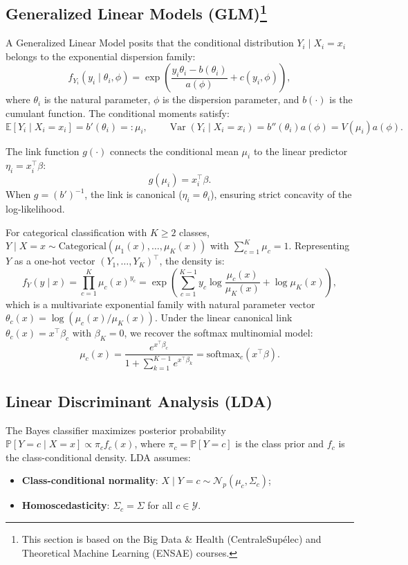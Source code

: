 \documentclass[a4paper,11pt]{paper}
\theoremstyle{plain}
\theoremstyle{definition}
\theoremstyle{remark}
\begin{document}
\subsection{Generalized Linear Models (GLM)\texorpdfstring{\protect\footnote{This section is based on the Big Data \& Health (CentraleSupélec) and Theoretical Machine Learning (ENSAE) courses.}}{}}

A Generalized Linear Model posits that the conditional distribution $Y_i \mid X_i = x_i$ belongs to the exponential dispersion family:
$$f_{Y_i}(y_i \mid \theta_i, \phi) = \exp\left( \frac{y_i \theta_i - b(\theta_i)}{a(\phi)} + c(y_i, \phi) \right),$$
where $\theta_i$ is the natural parameter, $\phi$ is the dispersion parameter, and $b(\cdot)$ is the cumulant function. The conditional moments satisfy:
$$\mathbb{E}[Y_i \mid X_i = x_i] = b'(\theta_i) =: \mu_i, \qquad \operatorname{Var}(Y_i \mid X_i = x_i) = b''(\theta_i) a(\phi) = V(\mu_i) a(\phi).$$

The link function $g(\cdot)$ connects the conditional mean $\mu_i$ to the linear predictor $\eta_i = x_i^\top \beta$:
$$g(\mu_i) = x_i^\top \beta.$$
When $g = (b')^{-1}$, the link is canonical ($\eta_i = \theta_i$), ensuring strict concavity of the log-likelihood.

For categorical classification with $K \ge 2$ classes, $Y \mid X = x \sim \text{Categorical}(\mu_1(x), \dots, \mu_K(x))$ with $\sum_{c=1}^K \mu_c = 1$. Representing $Y$ as a one-hot vector $(Y_1, \dots, Y_K)^\top$, the density is:
$$f_Y(y \mid x) = \prod_{c=1}^K \mu_c(x)^{y_c} = \exp\left( \sum_{c=1}^{K-1} y_c \log \frac{\mu_c(x)}{\mu_K(x)} + \log \mu_K(x) \right),$$
which is a multivariate exponential family with natural parameter vector $\theta_c(x) = \log(\mu_c(x)/\mu_K(x))$. Under the linear canonical link $\theta_c(x) = x^\top \beta_c$ with $\beta_K = 0$, we recover the softmax multinomial model:
$$\mu_c(x) = \frac{e^{x^\top \beta_c}}{1 + \sum_{k=1}^{K-1} e^{x^\top \beta_k}} = \text{softmax}_c(x^\top \beta).$$

\subsection{Linear Discriminant Analysis (LDA)}

The Bayes classifier maximizes posterior probability $\mathbb{P}[Y = c \mid X = x] \propto \pi_c f_c(x)$, where $\pi_c = \mathbb{P}[Y = c]$ is the class prior and $f_c$ is the class-conditional density. LDA assumes:
\begin{itemize}
    \item \textbf{Class-conditional normality}: $X \mid Y = c \sim \mathcal{N}_p(\mu_c, \Sigma_c)$;
    \item \textbf{Homoscedasticity}: $\Sigma_c = \Sigma$ for all $c \in \mathcal{Y}$.
\end{itemize}
\end{document}
